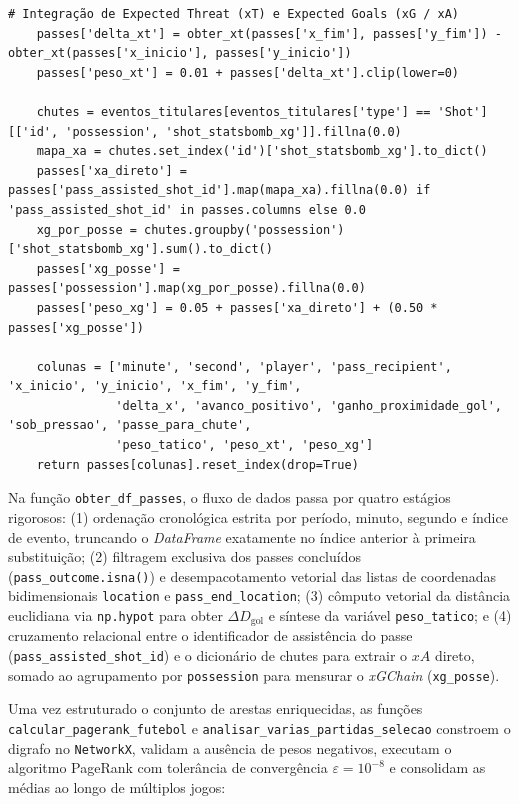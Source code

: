 \documentclass[10pt,a4paper]{article}
\theoremstyle{definition}
\theoremstyle{plain}
\theoremstyle{remark}
\begin{document}
\begin{lstlisting}[caption={Isolamento até a primeira substituição, cálculo de $\alpha$ e engenharia de atributos em \texttt{obter\_df\_passes}.}]
    # Integração de Expected Threat (xT) e Expected Goals (xG / xA)
    passes['delta_xt'] = obter_xt(passes['x_fim'], passes['y_fim']) - obter_xt(passes['x_inicio'], passes['y_inicio'])
    passes['peso_xt'] = 0.01 + passes['delta_xt'].clip(lower=0)

    chutes = eventos_titulares[eventos_titulares['type'] == 'Shot'][['id', 'possession', 'shot_statsbomb_xg']].fillna(0.0)
    mapa_xa = chutes.set_index('id')['shot_statsbomb_xg'].to_dict()
    passes['xa_direto'] = passes['pass_assisted_shot_id'].map(mapa_xa).fillna(0.0) if 'pass_assisted_shot_id' in passes.columns else 0.0
    xg_por_posse = chutes.groupby('possession')['shot_statsbomb_xg'].sum().to_dict()
    passes['xg_posse'] = passes['possession'].map(xg_por_posse).fillna(0.0)
    passes['peso_xg'] = 0.05 + passes['xa_direto'] + (0.50 * passes['xg_posse'])

    colunas = ['minute', 'second', 'player', 'pass_recipient', 'x_inicio', 'y_inicio', 'x_fim', 'y_fim',
               'delta_x', 'avanco_positivo', 'ganho_proximidade_gol', 'sob_pressao', 'passe_para_chute',
               'peso_tatico', 'peso_xt', 'peso_xg']
    return passes[colunas].reset_index(drop=True)
\end{lstlisting}

Na função \texttt{obter\_df\_passes}, o fluxo de dados passa por quatro estágios rigorosos: (1) ordenação cronológica estrita por período, minuto, segundo e índice de evento, truncando o \textit{DataFrame} exatamente no índice anterior à primeira substituição; (2) filtragem exclusiva dos passes concluídos (\texttt{pass\_outcome.isna()}) e desempacotamento vetorial das listas de coordenadas bidimensionais \texttt{location} e \texttt{pass\_end\_location}; (3) cômputo vetorial da distância euclidiana via \texttt{np.hypot} para obter $\Delta D_{\text{gol}}$ e síntese da variável \texttt{peso\_tatico}; e (4) cruzamento relacional entre o identificador de assistência do passe (\texttt{pass\_assisted\_shot\_id}) e o dicionário de chutes para extrair o $xA$ direto, somado ao agrupamento por \texttt{possession} para mensurar o \textit{xGChain} (\texttt{xg\_posse}).

Uma vez estruturado o conjunto de arestas enriquecidas, as funções \texttt{calcular\_pagerank\_futebol} e \texttt{analisar\_varias\_partidas\_selecao} constroem o digrafo no \texttt{NetworkX}, validam a ausência de pesos negativos, executam o algoritmo PageRank com tolerância de convergência $\varepsilon = 10^{-8}$ e consolidam as médias ao longo de múltiplos jogos:
\end{document}
